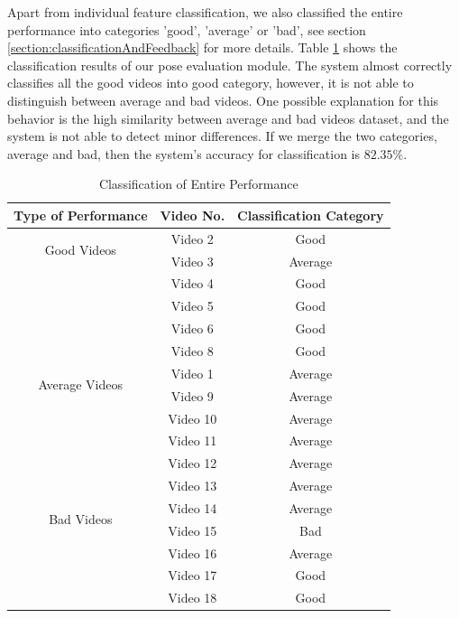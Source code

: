 Apart from individual feature classification, we also classified the entire performance into categories 'good', 'average' or 'bad', see section \ref{section:classificationAndFeedback} for more details. Table \ref{table:overallClassification} shows the classification results of our pose evaluation module. The system almost correctly classifies all the good videos into good category, however, it is not able to distinguish between average and bad videos. One possible explanation for this behavior is the high similarity between average and bad videos dataset, and the system is not able to detect minor differences. If we merge the two categories, average and bad, then the system's accuracy for classification is $82.35\%$.

\begin{table}
  \centering
  \begin{tabular}{|c|c|c|}
    \hline
    Type of Performance & Video No. & Classification Category  \\
        \hline
        \hline
        \multirow{2}{*}{Good Videos} 
          & Video 2 &  Good \\ \cline{2-3}
          & Video 3 &  Average \\ \cline{2-3}
          & Video 4 &  Good \\ \cline{2-3}
          & Video 5 &  Good \\ \cline{2-3}
          & Video 6 &  Good \\ \cline{2-3}
          & Video 8 &  Good \\ \cline{2-3}
          \hline

          \multirow{2}{*}{Average Videos} 
          & Video 1 &  Average  \\ \cline{2-3}
          & Video 9 &  Average  \\ \cline{2-3}
          & Video 10 &  Average  \\ \cline{2-3}
          & Video 11 &  Average  \\ \cline{2-3}
          & Video 12 &  Average  \\ \cline{2-3}
          & Video 13 &  Average  \\ \cline{2-3}
          \hline

          \multirow{2}{*}{Bad Videos} 
          & Video 14 &  Average  \\ \cline{2-3}
          & Video 15 &  Bad  \\ \cline{2-3}
          & Video 16 &  Average  \\ \cline{2-3}
          & Video 17 &  Good  \\ \cline{2-3}
          & Video 18 &  Good  \\ \cline{2-3}
          \hline
  \end{tabular}
\caption{Classification of Entire Performance}
\label{table:overallClassification}
\end{table}





